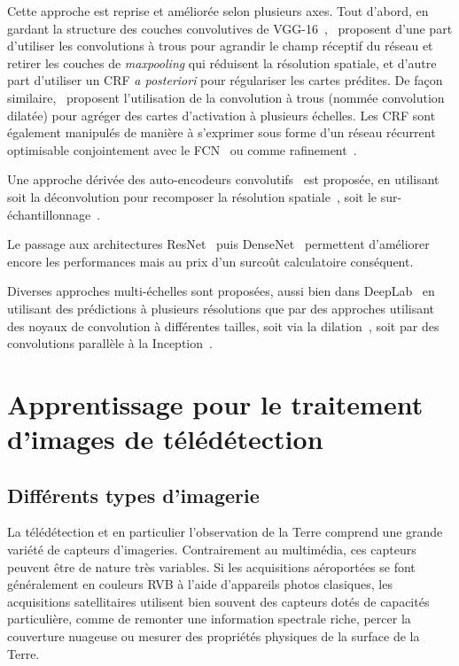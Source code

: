 Cette approche est reprise et améliorée selon plusieurs axes. Tout d'abord, en gardant la structure des couches convolutives de VGG-16~\cite{simonyan_very_2014},~\citet{l._c._chen_deeplab_2018} proposent d'une part d'utiliser les convolutions à trous pour agrandir le champ réceptif du réseau et retirer les couches de \emph{maxpooling} qui réduisent la résolution spatiale, et d'autre part d'utiliser un \gls{CRF} \emph{a posteriori} pour régulariser les cartes prédites. De façon similaire,~\citet{yu_multi-scale_2015} proposent l'utilisation de la convolution à trous (nommée convolution dilatée) pour agréger des cartes d'activation à plusieurs échelles. Les \gls{CRF} sont également manipulés de manière à s'exprimer sous forme d'un réseau récurrent optimisable conjointement avec le \gls{FCN}~\cite{zheng_conditional_2015} ou comme rafinement~\cite{arnab_higher_2015}.

Une approche dérivée des auto-encodeurs convolutifs~\cite{zhao_stacked_2015-1} est proposée, en utilisant soit la déconvolution pour recomposer la résolution spatiale~\cite{ronneberger_u-net_2015,nekrasov_global_2016,noh_learning_2015}, soit le sur-échantillonnage~\cite{badrinarayanan_segnet_2017}.

Le passage aux architectures ResNet~\cite{wu_high-performance_2016} puis DenseNet~\cite{jegou_one_2017} permettent d'améliorer encore les performances mais au prix d'un surcoût calculatoire conséquent.

Diverses approches multi-échelles sont proposées, aussi bien dans DeepLab~\cite{l._c._chen_deeplab_2018} en utilisant des prédictions à plusieurs résolutions que par des approches utilisant des noyaux de convolution à différentes tailles, soit via la dilation~\cite{yu_multi-scale_2015}, soit par des convolutions parallèle à la Inception~\cite{szegedy_going_2015,nekrasov_global_2016,zhao_pyramid_2017}.

\section{Apprentissage pour le traitement d'images de télédétection}

\subsection{Différents types d'imagerie}

La télédétection et en particulier l'observation de la Terre comprend une grande variété de capteurs d'imageries. Contrairement au multimédia, ces capteurs peuvent être de nature très variables. Si les acquisitions aéroportées se font généralement en couleurs \gls{RVB} à l'aide d'appareils photos clasiques, les acquisitions satellitaires utilisent bien souvent des capteurs dotés de capacités particulière, comme de remonter une information spectrale riche, percer la couverture nuageuse ou mesurer des propriétés physiques de la surface de la Terre.

